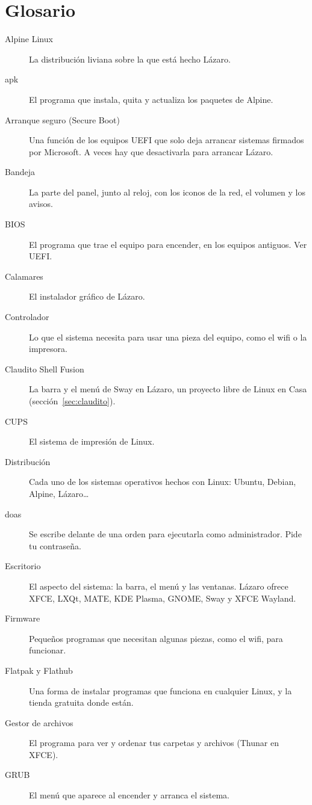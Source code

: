 \chapter{Glosario}\label{cap:a-glosario}

\begin{description}
  \item[Alpine Linux] La distribución liviana sobre la que está hecho
    Lázaro.
  \item[apk] El programa que instala, quita y actualiza los paquetes de
    Alpine.
  \item[Arranque seguro (Secure Boot)] Una función de los equipos UEFI que
    solo deja arrancar sistemas firmados por Microsoft. A veces hay que
    desactivarla para arrancar Lázaro.
  \item[Bandeja] La parte del panel, junto al reloj, con los iconos de la
    red, el volumen y los avisos.
  \item[BIOS] El programa que trae el equipo para encender, en los equipos
    antiguos. Ver UEFI.
  \item[Calamares] El instalador gráfico de Lázaro.
  \item[Controlador] Lo que el sistema necesita para usar una pieza del
    equipo, como el wifi o la impresora.
  \item[Claudito Shell Fusion] La barra y el menú de Sway en Lázaro, un
    proyecto libre de Linux en Casa (sección~\ref{sec:claudito}).
  \item[CUPS] El sistema de impresión de Linux.
  \item[Distribución] Cada uno de los sistemas operativos hechos con Linux:
    Ubuntu, Debian, Alpine, Lázaro\ldots
  \item[doas] Se escribe delante de una orden para ejecutarla como
    administrador. Pide tu contraseña.
  \item[Escritorio] El aspecto del sistema: la barra, el menú y las
    ventanas. Lázaro ofrece XFCE, LXQt, MATE, KDE Plasma, GNOME, Sway y
    XFCE Wayland.
  \item[Firmware] Pequeños programas que necesitan algunas piezas, como el
    wifi, para funcionar.
  \item[Flatpak y Flathub] Una forma de instalar programas que funciona en
    cualquier Linux, y la tienda gratuita donde están.
  \item[Gestor de archivos] El programa para ver y ordenar tus carpetas y
    archivos (Thunar en XFCE).
  \item[GRUB] El menú que aparece al encender y arranca el sistema.

\end{description}
